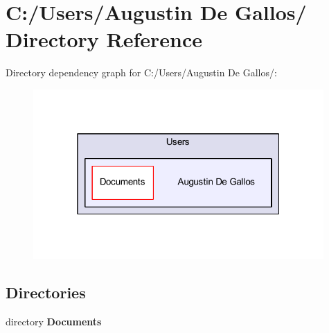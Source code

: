 \section{C\-:/\-Users/\-Augustin De Gallos/ Directory Reference}
\label{dir_33e181fb4d870cfceae98850819d2c0f}
Directory dependency graph for C\-:/\-Users/\-Augustin De Gallos/\-:\nopagebreak
\begin{figure}[H]
\begin{center}
\leavevmode
\includegraphics[width=314pt]{dir_33e181fb4d870cfceae98850819d2c0f_dep}
\end{center}
\end{figure}
\subsection*{Directories}
\begin{DoxyCompactItemize}
\item 
directory {\bf Documents}
\end{DoxyCompactItemize}
